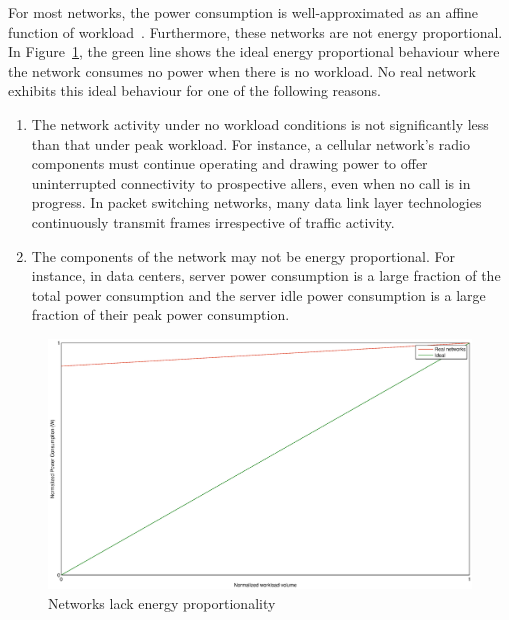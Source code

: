 For most networks, the power consumption is well-approximated as an affine function of workload~\cite{Peng:2011:TPS:2030613.2030628,Fan:power:ICSA:2007}. Furthermore, these networks are not energy proportional. In Figure~\ref{fig:ener-prop}, the green line shows the ideal energy proportional behaviour where the network consumes no power when there is no workload. No real network exhibits this ideal behaviour for one of the following reasons. 
\begin{enumerate}
\item The network activity under no workload conditions is not significantly less than that under peak workload. For instance, a cellular network's radio components must continue operating and drawing power to offer uninterrupted connectivity to prospective allers, even when no call is in progress. In packet switching networks, many data link layer technologies continuously transmit frames irrespective of traffic activity. 
\item The components of the network may not be energy proportional. For instance, in data centers, server power consumption is a large fraction of the total power consumption and the server idle power consumption is a large fraction of their peak power consumption. 
\end{enumerate}

\begin{figure}
\includegraphics[width=1\textwidth]{pics/enerprop.eps}
\caption{Networks lack energy proportionality}
\label{fig:ener-prop}
\end{figure} 

